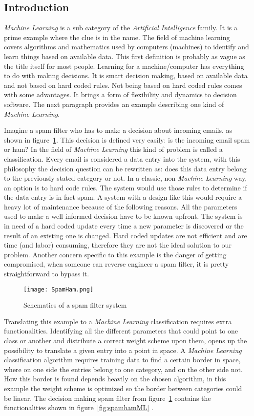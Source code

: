 \subsection{Introduction}
\textit{Machine Learning} is a sub category of the  \textit{Artificial Intelligence} family.
It is a prime example where the clue is in the name.
The field of machine learning covers algorithms and mathematics used by computers (machines) to identify and learn things based on available data.
This first definition is probably as vague as the title itself for most people.
Learning for a machine/computer has everything to do with making decisions. 
It is smart decision making, based on available data and not based on hard coded rules.
Not being based on hard coded rules comes with some advantages.
It brings a form of flexibility and dynamics to decision software. 
The next paragraph provides an example describing one kind of \textit{Machine Learning}.
\par
Imagine a spam filter who has to make a decision about incoming emails, as shown in figure~\ref{fig:spamham}.
This decision is defined very easily: is the incoming email spam or ham?
In the field of \textit{Machine Learning} this kind of problem is called a classification.
Every email is considered a data entry into the system, with this philosophy the decision question can be rewritten as: does this data entry belong to the previously stated category or not.
In a classic, non \textit{Machine Learning} way, an option is to hard code rules.
The system would use those rules to determine if the data entry is in fact spam.
A system with a design like this would require a heavy lot of maintenance because of the following reasons.
All the parameters used to make a well informed decision have to be known upfront. 
The system is in need of a hard coded update every time a new parameter is discovered or the result of an existing one is changed.
Hard coded updates are not efficient and are time (and labor) consuming, therefore they are not the ideal solution to our problem.
Another concern specific to this example is the danger of getting compromised, when someone can reverse engineer a spam filter, it is pretty straightforward to bypass it.
\begin{figure}[H]
	\centering
	\texttt{[image: SpamHam.png]}
	\caption{Schematics of a spam filter system}
	\label{fig:spamham}
\end{figure}
Translating this example to a \textit{Machine Learning} classification requires extra functionalities.
Identifying all the different parameters that could point to one class or another and distribute a correct weight scheme upon them, opens up the possibility to translate a given entry into a point in space.
A \textit{Machine Learning} classification algorithm requires training data to find a certain border in space, where on one side the entries belong to one category, and on the other side not.
How this border is found depends heavily on the chosen algorithm, in this example the weight scheme is optimized so the border between categories could be linear. 
The decision making spam filter from figure~\ref{fig:spamham} contains the functionalities shown in figure~\ref{fig:spamhamML} .

